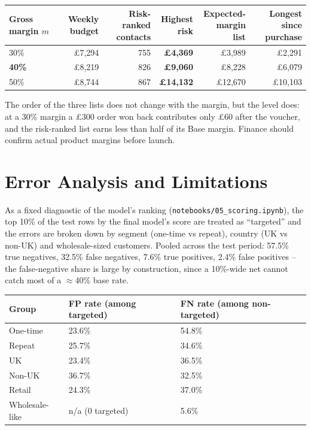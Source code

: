 \begin{center}
\footnotesize
\begin{tabular}{@{}p{2.2cm}rrrrr@{}}
    \toprule
    Gross margin $m$ & \shortstack[r]{Weekly\\budget} & \shortstack[r]{Risk-ranked\\contacts} & \shortstack[r]{Highest\\risk} & \shortstack[r]{Expected-\\margin list} & \shortstack[r]{Longest since\\purchase} \\
    \midrule
    30\% & \pounds7,294 & 755 & \textbf{\pounds4,369} & \pounds3,989 & \pounds2,291 \\
    \textbf{40\%} & \pounds8,219 & 826 & \textbf{\pounds9,060} & \pounds8,228 & \pounds6,079 \\
    50\% & \pounds8,744 & 867 & \textbf{\pounds14,132} & \pounds12,670 & \pounds10,103 \\
    \bottomrule
\end{tabular}
\end{center}

The order of the three lists does not change with the margin, but the level does: at a 30\% margin a \pounds300 order won back contributes only \pounds60 after the voucher, and the risk-ranked list earns less than half of its Base margin. Finance should confirm actual product margins before launch.

\section{Error Analysis and Limitations}
\label{sec:7-12}

As a fixed diagnostic of the model's ranking (\texttt{notebooks/05\_scoring.ipynb}), the top 10\% of the test rows by the final model's score are treated as ``targeted'' and the errors are broken down by segment (one-time vs repeat), country (UK vs non-UK) and wholesale-sized customers. Pooled across the test period: 57.5\% true negatives, 32.5\% false negatives, 7.6\% true positives, 2.4\% false positives -- the false-negative share is large by construction, since a 10\%-wide net cannot catch most of a $\approx$40\% base rate.

\begin{center}
\begin{tabular}{@{}p{3.6cm}p{2.6cm}p{2.6cm}@{}}
    \toprule
    Group & FP rate (among targeted) & FN rate (among non-targeted) \\
    \midrule
    One-time & 23.6\% & 54.8\% \\
    Repeat & 25.7\% & 34.6\% \\
    \midrule
    UK & 23.4\% & 36.5\% \\
    Non-UK & 36.7\% & 32.5\% \\
    \midrule
    Retail & 24.3\% & 37.0\% \\
    Wholesale-like & n/a (0 targeted) & 5.6\% \\
    \bottomrule
\end{tabular}
\end{center}

